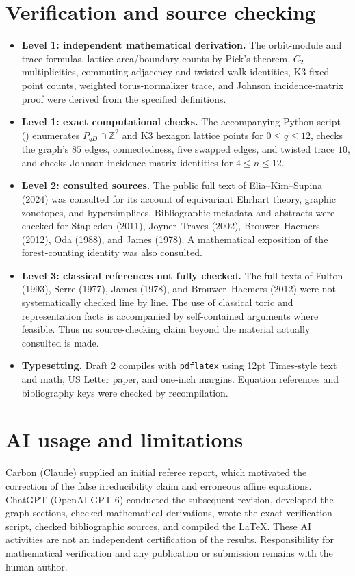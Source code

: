\documentclass[12pt,letterpaper]{article}
\begin{document}
\section{Verification and source checking}
\begin{itemize}
\item \textbf{Level 1: independent mathematical derivation.} The orbit-module and trace formulas, lattice area/boundary counts by Pick's theorem, $C_2$ multiplicities, commuting adjacency and twisted-walk identities, K3 fixed-point counts, weighted torus-normalizer trace, and Johnson incidence-matrix proof were derived from the specified definitions.
\item \textbf{Level 1: exact computational checks.} The accompanying Python script () enumerates $P_{qD}\cap\mathbb Z^2$ and K3 hexagon lattice points for $0\leq q\leq12$, checks the graph's $85$ edges, connectedness, five swapped edges, and twisted trace $10$, and checks Johnson incidence-matrix identities for $4\leq n\leq12$.
\item \textbf{Level 2: consulted sources.} The public full text of Elia--Kim--Supina (2024) was consulted for its account of equivariant Ehrhart theory, graphic zonotopes, and hypersimplices. Bibliographic metadata and abstracts were checked for Stapledon (2011), Joyner--Traves (2002), Brouwer--Haemers (2012), Oda (1988), and James (1978). A mathematical exposition of the forest-counting identity was also consulted.
\item \textbf{Level 3: classical references not fully checked.} The full texts of Fulton (1993), Serre (1977), James (1978), and Brouwer--Haemers (2012) were not systematically checked line by line. The use of classical toric and representation facts is accompanied by self-contained arguments where feasible. Thus no source-checking claim beyond the material actually consulted is made.
\item \textbf{Typesetting.} Draft 2 compiles with \texttt{pdflatex} using 12pt Times-style text and math, US Letter paper, and one-inch margins. Equation references and bibliography keys were checked by recompilation.
\end{itemize}

\section{AI usage and limitations}
Carbon (Claude) supplied an initial referee report, which motivated the correction of the false irreducibility claim and erroneous affine equations. ChatGPT (OpenAI GPT-6) conducted the subsequent revision, developed the graph sections, checked mathematical derivations, wrote the exact verification script, checked bibliographic sources, and compiled the LaTeX. These AI activities are not an independent certification of the results. Responsibility for mathematical verification and any publication or submission remains with the human author.
\end{document}
